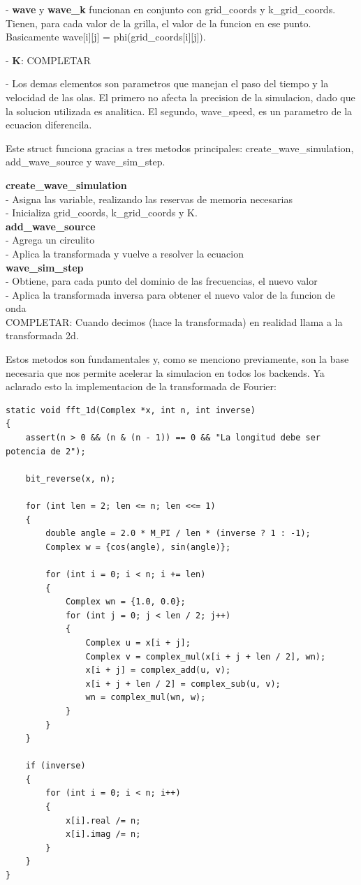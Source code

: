 \documentclass[a4paper]{article}
\begin{document}
- \textbf{wave} y \textbf{wave_k} funcionan en conjunto con grid_coords y k_grid_coords. Tienen, para cada valor de la grilla, el valor de la funcion en ese punto. Basicamente
wave[i][j] = phi(grid_coords[i][j]).

- \textbf{K}: COMPLETAR

- Los demas elementos son parametros que manejan el paso del tiempo y la velocidad de las olas. El primero no afecta la precision de la simulacion, dado que
la solucion utilizada es analitica. El segundo, wave_speed, es un parametro de la ecuacion diferencila.

Este struct funciona gracias a tres metodos principales: create_wave_simulation, add_wave_source y wave_sim_step.

\textbf{create_wave_simulation} \\
- Asigna las variable, realizando las reservas de memoria necesarias \\
- Inicializa grid_coords, k_grid_coords y K. \\

\textbf{add_wave_source} \\
- Agrega un circulito \\
- Aplica la transformada y vuelve a resolver la ecuacion \\

\textbf{wave_sim_step} \\
- Obtiene, para cada punto del dominio de las frecuencias, el nuevo valor \\
- Aplica la transformada inversa para obtener el nuevo valor de la funcion de onda \\

COMPLETAR: Cuando decimos (hace la transformada) en realidad llama a la transformada 2d.

Estos metodos son fundamentales y, como se menciono previamente, son la base necesaria que nos permite acelerar la simulacion en todos los backends. Ya aclarado
esto la implementacion de la transformada de Fourier:

\begin{verbatim}
static void fft_1d(Complex *x, int n, int inverse)
{
    assert(n > 0 && (n & (n - 1)) == 0 && "La longitud debe ser potencia de 2");

    bit_reverse(x, n);

    for (int len = 2; len <= n; len <<= 1)
    {
        double angle = 2.0 * M_PI / len * (inverse ? 1 : -1);
        Complex w = {cos(angle), sin(angle)};

        for (int i = 0; i < n; i += len)
        {
            Complex wn = {1.0, 0.0};
            for (int j = 0; j < len / 2; j++)
            {
                Complex u = x[i + j];
                Complex v = complex_mul(x[i + j + len / 2], wn);
                x[i + j] = complex_add(u, v);
                x[i + j + len / 2] = complex_sub(u, v);
                wn = complex_mul(wn, w);
            }
        }
    }

    if (inverse)
    {
        for (int i = 0; i < n; i++)
        {
            x[i].real /= n;
            x[i].imag /= n;
        }
    }
}
\end{verbatim}
\end{document}
